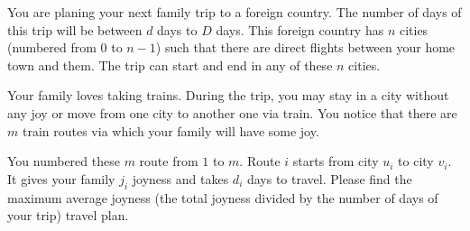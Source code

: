 You are planing your next family trip to a foreign country.
The number of days of this trip will be between $d$ days to $D$ days.
This foreign country has $n$ cities (numbered from $0$ to $n-1$) 
such that there are direct flights between your home town and them.
The trip can start and end in any of these $n$ cities.

Your family loves taking trains.
During the trip, you may stay in a city without any joy or move from one city to another one via train.
You notice that there are $m$ train routes via which your family will have some joy.

You numbered these $m$ route from $1$ to $m$. Route $i$ starts from city $u_i$ to city $v_i$.
It gives your family $j_i$ joyness and takes $d_i$ days to travel.
Please find the maximum average joyness (the total joyness divided by the number of days of your trip) travel plan.
